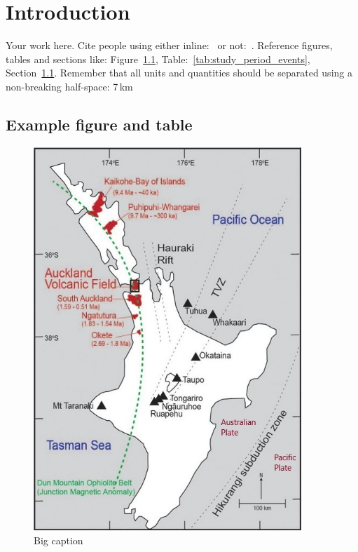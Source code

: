 \chapter{Introduction}

Your work here. Cite people using either inline:~\citet{Hopkins2021213} or not:~\citep{Hopkins2021213}.
Reference figures, tables and sections like: Figure~\ref{fig:tectonic_setting}, Table:~\ref{tab:study_period_events}, Section~\ref{example}. 
Remember that all units and quantities should be separated using a non-breaking half-space: 7\,km


\section{Example figure and table}\label{example}

\begin{figure}

    \centering

    \includegraphics[width=0.9\textwidth]{./Figures/Hopkins2021Fig1Av2.jpg}

    \centering

    \caption[Short caption for ToC]{Big caption}
    \label{fig:tectonic_setting}

\end{figure}


